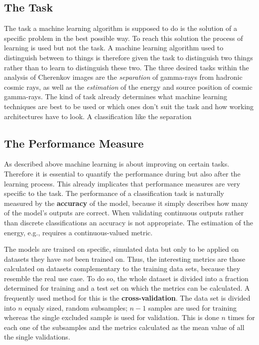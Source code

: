 \subsection{The Task}
%
The task a machine learning algorithm is supposed to do is the solution of a
specific problem in the best possible way. To reach this solution the process
of learning is used but not the task. A machine learning algorithm used to
distinguish between to things is therefore given the task to distinguish two
things rather than to learn to distinguish these two. The three desired tasks
within the analysis of Cherenkov images are the \textit{separation} of
gamma-rays from hadronic cosmic rays, as well as the \textit{estimation} of the
energy and source position of cosmic gamma-rays. The kind of task already
determines what machine learning techniques are best to be used or which ones
don't suit the task and how working architectures have to look. A classification like the separation

\subsection{The Performance Measure}
%
As described above machine learning is about improving on certain tasks.
Therefore it is essential to quantify the performance during but also after the
learning process. This already implicates that performance measures are very
specific to the task. The performance of a classification task is naturally
measured by the \textbf{accuracy} of the model, because it simply describes how
many of the model's outputs are correct. When validating continuous outputs
rather than discrete classifications an accuracy is not appropriate. The
estimation of the energy, e.g., requires a continuous-valued metric.

The models are trained on specific, simulated data but only to be applied on
datasets they have \textit{not} been trained on. Thus, the interesting metrics
are those calculated on datasets complementary to the training data sets,
because they resemble the real use case. To do so, the whole dataset is divided
into a fraction determined for training and a test set on which the metrics can
be calculated. A frequently used method for this is the
\textbf{cross-validation}. The data set is divided into $n$ equaly sized, random
subsamples; $n-1$ samples are used for training whereas the single excluded
sample is used for validation. This is done $n$ times for each one of the
subsamples and the metrics calculated as the mean value of all the single
validations.

